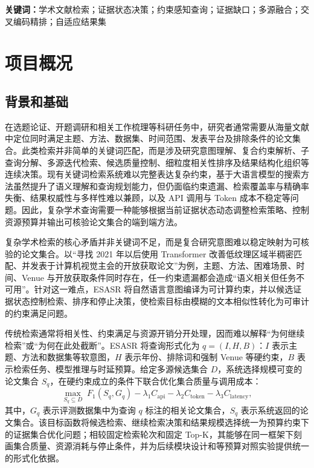 \documentclass[a4paper,12pt,fontset=none]{ctexart}
\begin{document}
\textbf{关键词：}学术文献检索；证据状态决策；约束感知查询；证据缺口；多源融合；交叉编码精排；自适应结果集

\clearpage
\section{项目概况}

\subsection{背景和基础}

在选题论证、开题调研和相关工作梳理等科研任务中，研究者通常需要从海量文献中定位同时满足主题、方法、数据集、时间范围、发表平台及排除条件的论文集合。此类检索并非简单的关键词匹配，而是涉及研究意图理解、复合约束解析、子查询分解、多源迭代检索、候选质量控制、细粒度相关性排序及结果结构化组织等连续决策。现有关键词检索系统难以完整表达复杂约束，基于大语言模型的搜索方法虽然提升了语义理解和查询规划能力，但仍面临约束遗漏、检索覆盖率与精确率失衡、结果权威性与多样性难以兼顾，以及 API 调用与 Token 成本不稳定等问题。因此，复杂学术查询需要一种能够根据当前证据状态动态调整检索策略、控制资源预算并输出可核验论文集合的端到端方法。

复杂学术检索的核心矛盾并非关键词不足，而是复合研究意图难以稳定映射为可核验的论文集合。以“寻找 2021 年以后使用 Transformer 改善低纹理区域半稠密匹配、并发表于计算机视觉主会的开放获取论文”为例，主题、方法、困难场景、时间、Venue 与开放获取条件同时存在，任一约束遗漏都会造成“语义相关但任务不可用”。针对这一难点，ESASR 将自然语言意图编译为可计算约束，并以候选证据状态控制检索、排序和停止决策，使检索目标由模糊的文本相似性转化为可审计的约束满足问题。

传统检索通常将相关性、约束满足与资源开销分开处理，因而难以解释“为何继续检索”或“为何在此处截断”。ESASR 将查询形式化为 $q=(I,H,B)$：$I$ 表示主题、方法和数据集等软意图，$H$ 表示年份、排除词和强制 Venue 等硬约束，$B$ 表示检索任务、模型推理与时延预算。给定多源候选集合 $D$，系统选择规模可变的论文集合 $S_q$，在硬约束成立的条件下联合优化集合质量与调用成本：
\begin{equation}
\max_{S_q\subseteq D}\;F_1(S_q,G_q)-\lambda_1 C_{\mathrm{api}}-\lambda_2 C_{\mathrm{token}}-\lambda_3 C_{\mathrm{latency}},
\end{equation}
其中，\(G_q\) 表示评测数据集中为查询 \(q\) 标注的相关论文集合，\(S_q\) 表示系统返回的论文集合。该目标函数将候选检索、继续检索决策和结果规模选择统一为预算约束下的证据集合优化问题；相较固定检索轮次和固定 Top-K，其能够在同一框架下刻画集合质量、资源消耗与停止条件，并为后续模块设计和等预算对照实验提供统一的形式化依据。
\end{document}

